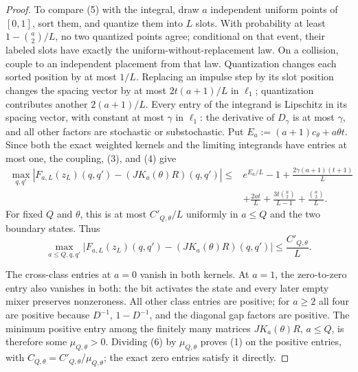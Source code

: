 \begin{proof}
To compare (5) with the integral, draw $a$ independent uniform points
of $[0,1]$, sort them, and quantize them into $L$ slots. With
probability at least $1-\binom a2/L$, no two quantized points agree;
conditional on that event, their labeled slots have exactly the
uniform-without-replacement law. On a collision, couple to an
independent placement from that law. Quantization changes each sorted
position by at most $1/L$. Replacing an impulse step by its slot
position changes the spacing vector by at most $2t(a+1)/L$ in
$\ell_1$; quantization contributes another $2(a+1)/L$.
Every entry of the integrand is Lipschitz in its spacing vector,
with constant at most $\gamma$ in $\ell_1$: the derivative of
$D_\gamma$ is at most $\gamma$, and all other factors are stochastic
or substochastic. Put $E_a:=(a+1)c_\theta+a\theta t$.
Since both the exact weighted kernels and the limiting integrands
have entries at most one, the coupling, (3), and (4) give
\[
 \begin{aligned}
 \max_{q,q'}|F_{a,L}(z_L)(q,q')-(JK_a(\theta)R)(q,q')|
 \le{}&e^{E_a/L}-1+\frac{2\gamma(a+1)(t+1)}L\\
 &+\frac{2at}L+\frac{3t\binom a2}{L-1}
   +\frac{\binom a2}L.
 \end{aligned}
\]
For fixed $Q$ and $\theta$, this is at most $C'_{Q,\theta}/L$
uniformly in $a\le Q$ and the two boundary states. Thus
\[
 \max_{a\le Q,q,q'}
 \bigl|F_{a,L}(z_L)(q,q')-(JK_a(\theta)R)(q,q')\bigr|
 \le\frac{C'_{Q,\theta}}L.
 \tag{6}
\]

The cross-class entries at $a=0$ vanish in both kernels. At $a=1$,
the zero-to-zero entry also vanishes in both: the bit activates the
state and every later empty mixer preserves nonzeroness. All other
class entries are positive; for $a\ge2$ all four are positive because
$D^{-1}$, $1-D^{-1}$, and the diagonal gap factors are positive.
The minimum positive entry among the finitely many matrices
$JK_a(\theta)R$, $a\le Q$, is therefore some $\mu_{Q,\theta}>0$.
Dividing (6) by $\mu_{Q,\theta}$ proves (1) on the positive entries,
with $C_{Q,\theta}=C'_{Q,\theta}/\mu_{Q,\theta}$; the exact zero
entries satisfy it directly.
\end{proof}

